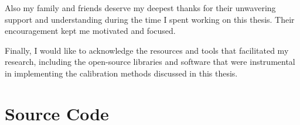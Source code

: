 \documentclass[12pt]{scrartcl}
\begin{document}
Also my family and friends deserve my deepest thanks for their unwavering support and understanding during the time I spent working on this thesis. Their encouragement kept me motivated and focused.
\newline

Finally, I would like to acknowledge the resources and tools that facilitated my research, including the open-source libraries and software that were instrumental in implementing the calibration methods discussed in this thesis.

\section{Source Code}

\end{document}
